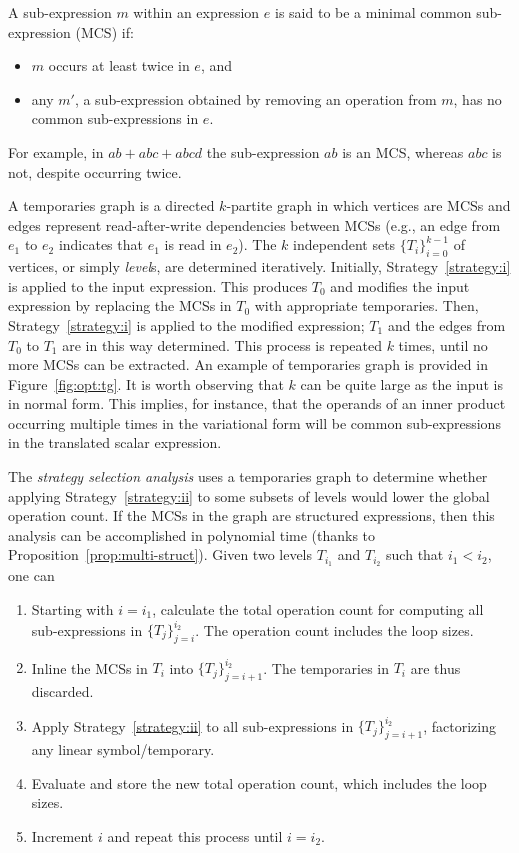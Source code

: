 \begin{Def}
A sub-expression $m$ within an expression $e$ is said to be a minimal common sub-expression (MCS) if:
\begin{itemize}
\item $m$ occurs at least twice in $e$, and
\item any $m'$, a sub-expression obtained by removing an operation from $m$, has no common sub-expressions in $e$.
\end{itemize}
\end{Def}

For example, in $a b + a b c + a b c d$ the sub-expression $a b$ is an MCS, whereas $a b c$ is not, despite occurring twice. 

A temporaries graph is a directed $k$-partite graph in which vertices are MCSs and edges represent read-after-write dependencies between MCSs (e.g., an edge from $e_1$ to $e_2$ indicates that $e_1$ is read in $e_2$). The $k$ independent sets $\lbrace T_i \rbrace_{i=0}^{k-1}$ of vertices, or simply {\em level}s, are determined iteratively. Initially, Strategy~\ref{strategy:i} is applied to the input expression. This produces $T_0$ and modifies the input expression by replacing the MCSs in $T_0$ with appropriate temporaries. Then, Strategy~\ref{strategy:i} is applied to the modified expression; $T_1$ and the edges from $T_0$ to $T_1$ are in this way determined. This process is repeated $k$ times, until no more MCSs can be extracted. An example of temporaries graph is provided in Figure~\ref{fig:opt:tg}. It is worth observing that $k$ can be quite large as the input is in normal form. This implies, for instance, that the operands of an inner product occurring multiple times in the variational form will be common sub-expressions in the translated scalar expression.

The {\em strategy selection analysis} uses a temporaries graph to determine whether applying Strategy~\ref{strategy:ii} to some subsets of levels would lower the global operation count. If the MCSs in the graph are structured expressions, then this analysis can be accomplished in polynomial time (thanks to Proposition~\ref{prop:multi-struct}). Given two levels $T_{i_1}$ and $T_{i_2}$ such that $i_1 < i_2$, one can

\begin{enumerate}
\item Starting with $i = i_1$, calculate the total operation count for computing all sub-expressions in $\lbrace T_j \rbrace_{j=i}^{i_2}$. The operation count includes the loop sizes.
\item Inline the MCSs in $T_{i}$ into $\lbrace T_j \rbrace_{j=i + 1}^{i_2}$. The temporaries in $T_{i}$ are thus discarded.
\item Apply Strategy~\ref{strategy:ii} to all sub-expressions in $\lbrace T_j \rbrace_{j=i + 1}^{i_2}$, factorizing any linear symbol/temporary.
\item Evaluate and store the new total operation count, which includes the loop sizes.
\item Increment $i$ and repeat this process until $i = i_2$.
\end{enumerate}

